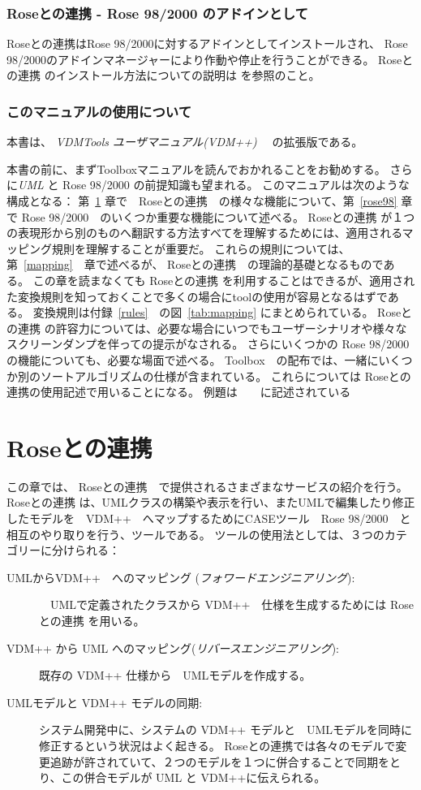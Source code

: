 \documentclass[\pformat,12pt]{jarticle}
\newcommand{\vdmpp}{VDM++}
\newcommand{\link}{Roseとの連携}
\newcommand{\rose}{Rose 98/2000}
\begin{document}
\subsubsection*{\link{} - \rose{} のアドインとして}
 \link{}は\rose{}に対するアドインとしてインストールされ、 \rose{}のアドインマネージャーにより作動や停止を行うことができる。
\link{} のインストール方法についての説明は \cite{InstallPPMan-SCSK}を参照のこと。
\subsubsection*{このマニュアルの使用について}

本書は、 {\it VDMTools ユーザマニュアル(\vdmpp{})} \cite{UserManPP-SCSK}　の拡張版である。

本書の前に、まずToolboxマニュアルを読んでおかれることをお勧めする。
さらに{\it UML} \cite{Booch&97} と \rose{} \cite{Rational98} の前提知識も望まれる。
このマニュアルは次のような構成となる：
第~\ref{roselink} 章で　\link{}　の様々な機能について、第~\ref{rose98} 章で \rose{}　のいくつか重要な機能について述べる。
 \link{} が１つの表現形から別のものへ翻訳する方法すべてを理解するためには、適用されるマッピング規則を理解することが重要だ。
これらの規則については、第~\ref{mapping}　章で述べるが、
 \link{}　の理論的基礎となるものである。
この章を読まなくても \link{} を利用することはできるが、適用された変換規則を知っておくことで多くの場合にtoolの使用が容易となるはずである。
変換規則は付録~\ref{rules}　の図~\ref{tab:mapping} にまとめられている。
 \link{} の許容力については、必要な場合にいつでもユーザーシナリオや様々なスクリーンダンプを伴っての提示がなされる。
さらにいくつかの \rose{}　の機能についても、必要な場面で述べる。
Toolbox　の配布では、一緒にいくつか別のソートアルゴリズムの仕様が含まれている。
これらについては \link{}の使用記述で用いることになる。
例題は　\cite{SortExpp-SCSK}　に記述されている

\newpage
\section{\link{}} \label{roselink}

この章では、 \link{}　で提供されるさまざまなサービスの紹介を行う。 
\link{} は、UMLクラスの構築や表示を行い、またUMLで編集したり修正したモデルを　\vdmpp{}　へマップするためにCASEツール　\rose{}　と相互のやり取りを行う、ツールである。
ツールの使用法としては、３つのカテゴリーに分けられる：

\begin{description}

\item[UMLから\vdmpp{}　へのマッピング ({\em フォワードエンジニアリング}):]　UMLで定義されたクラスから \vdmpp{}　仕様を生成するためには \link{} を用いる。
\item[\vdmpp{} から UML へのマッピング({\em リバースエンジニアリング}):] 既存の \vdmpp{} 仕様から　UMLモデルを作成する。
\item[UMLモデルと \vdmpp{} モデルの同期:] システム開発中に、システムの \vdmpp{} モデルと　UMLモデルを同時に修正するという状況はよく起きる。
 \link{}では各々のモデルで変更追跡が許されていて、２つのモデルを１つに併合することで同期をとり、この併合モデルが UML と \vdmpp{}に伝えられる。
\end{description}
\end{document}
